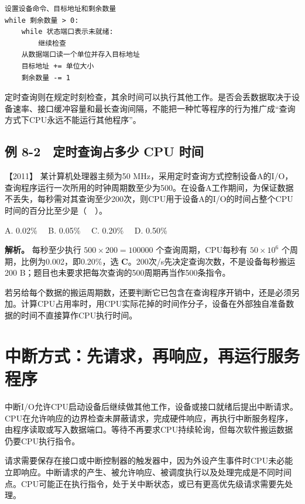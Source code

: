 \par\medskip\noindent
\begin{minipage}{\linewidth}
\begin{verbatim}
设置设备命令、目标地址和剩余数量
while 剩余数量 > 0:
    while 状态端口表示未就绪:
        继续检查
    从数据端口读一个单位并存入目标地址
    目标地址 += 单位大小
    剩余数量 -= 1
\end{verbatim}
\end{minipage}\par\medskip

定时查询则在规定时刻检查，其余时间可以执行其他工作。是否会丢数据取决于设备速率、接口缓冲容量和最长查询间隔，不能把一种忙等程序的行为推广成``查询方式下CPU永远不能运行其他程序''。

\subsection{例 8-2　定时查询占多少 CPU 时间}\label{co-ex8-2}

\noindent{}【2011】 某计算机处理器主频为50 MHz，采用定时查询方式控制设备A的I/O，查询程序运行一次所用的时钟周期数至少为500。在设备A工作期间，为保证数据不丢失，每秒需对其查询至少200次，则CPU用于设备A的I/O的时间占整个CPU时间的百分比至少是（　）。

A. 0.02\%　 B. 0.05\%　 C. 0.20\%　 D. 0.50\%


\textbf{解析。} 每秒至少执行 \(500\times200=100000\) 个查询周期，CPU每秒有 \(50\times10^6\) 个周期，比例为0.002，即0.20\%，选 \textbf{C}。200次/s先决定查询次数，不是设备每秒搬运200 B；题目也未要求把每次查询的500周期再当作500条指令。

若另给每个数据的搬运周期数，还要判断它已包含在查询程序开销中，还是必须另加。计算CPU占用率时，用CPU实际花掉的时间作分子，设备在外部独自准备数据的时间不直接算作CPU执行时间。

\section{中断方式：先请求，再响应，再运行服务程序}\label{co-08-03}

中断I/O允许CPU启动设备后继续做其他工作，设备或接口就绪后提出中断请求。CPU在允许响应的边界检查未屏蔽请求，完成硬件响应，再执行中断服务程序，由程序读取或写入数据端口。等待不再要求CPU持续轮询，但每次软件搬运数据仍要CPU执行指令。

请求需要保存在接口或中断控制器的触发器中，因为外设产生事件时CPU未必能立即响应。中断请求的产生、被允许响应、被调度执行以及处理完成是不同时间点。CPU可能正在执行指令，处于关中断状态，或已有更高优先级请求需要先处理。

